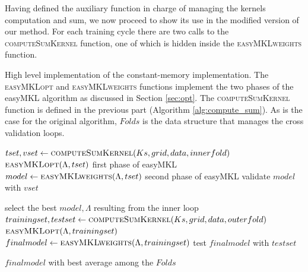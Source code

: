 Having defined the auxiliary function in charge of managing the kernels computation
and sum, we now proceed to show its use in the modified version of our method.
For each training cycle there are two calls to the \textsc{computeSumKernel}
function, one of which is hidden inside the \textsc{easyMKLweights} function.

\begin{algorithm}
    \caption{
        High level implementation of the constant-memory implementation.
        The \textsc{easyMKLopt} and \textsc{easyMKLweights} functions implement
        the two phases of the easyMKL algorithm as discussed in Section \ref{sec:opt}.
        The \textsc{computeSumKernel} function is defined in the previous part
        (Algorithm \ref{alg:compute_sum}).
        As is the case for the original algorithm, $Folds$ is the data structure
        that manages the cross validation loops.
    }

    \label{alg:method_me}
    \begin{algorithmic}[1]
                    \State $tset,vset \gets \Call{computeSumKernel}{Ks,grid,data,innerfold}$
                    \State $\Call{easyMKLopt}{\Lambda,tset}$
                    \Comment first phase of easyMKL
                    \State $model \gets \Call{easyMKLweights}{\Lambda,tset}$
                    \Comment second phase of easyMKL
                    \State validate $model$ with $vset$
                \EndFor
            \EndFor
            
            \State select the best $model,\Lambda$ resulting from the inner loop
            \State $trainingset,testset \gets \Call{computeSumKernel}{Ks,grid,data,outerfold}$
            \State $\Call{easyMKLopt}{\Lambda,trainingset}$
            \State $finalmodel \gets \Call{easyMKLweights}{\Lambda,trainingset}$
            \State test $finalmodel$ with $testset$
        \EndFor

        \State \Return $finalmodel$ with best average among the $Folds$
    \end{algorithmic}
\end{algorithm}



